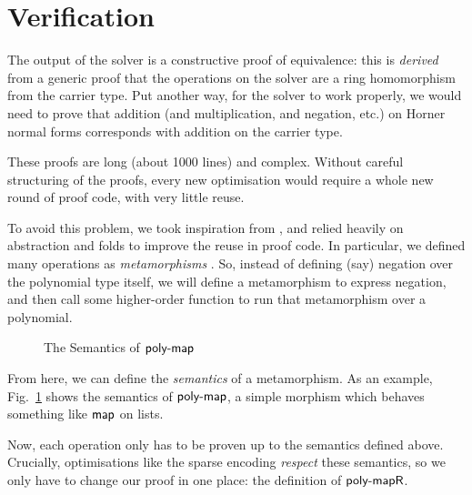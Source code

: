 \documentclass[acmsmall,review,anonymous]{acmart}\settopmatter{printfolios=true,printccs=false,printacmref=false}
\theoremstyle{remark}
\begin{document}
\section{Verification} \label{verif}
The output of the solver is a constructive proof of equivalence: this is
\emph{derived} from a generic proof that the operations on the solver are a ring
homomorphism from the carrier type. Put another way, for the solver to work
properly, we would need to prove that addition (and multiplication, and
negation, etc.) on Horner normal forms corresponds with addition on the carrier
type.

These proofs are long (about 1000 lines) and complex. Without careful
structuring of the proofs, every new optimisation would require a whole new
round of proof code, with very little reuse.

To avoid this problem, we took inspiration from \citet{mu_algebra_2009}, and
relied heavily on abstraction and folds to improve the reuse in proof code. In
particular, we defined many operations as \emph{metamorphisms}
\cite{gibbons_metamorphisms_2007}. So, instead of defining (say) negation over
the polynomial type itself, we will define a metamorphism to express negation,
and then call some higher-order function to run that metamorphism over a
polynomial.
\begin{center}
\end{center}

\begin{figure}
  \vspace{-18pt}
  \caption{The Semantics of \(\AgdaFunction{poly-map}\)}
  \label{poly-map}
\end{figure}

From here, we can define the \emph{semantics} of a metamorphism. As an example,
Fig.~\ref{poly-map} shows the semantics of \(\AgdaFunction{poly-map}\), a simple
morphism which behaves something like \(\AgdaFunction{map}\) on lists.

Now, each operation only has to be proven up to the semantics defined above.
Crucially, optimisations like the sparse encoding \emph{respect} these
semantics, so we only have to change our proof in one place: the definition of
\(\AgdaFunction{poly-mapR}\).
\end{document}
